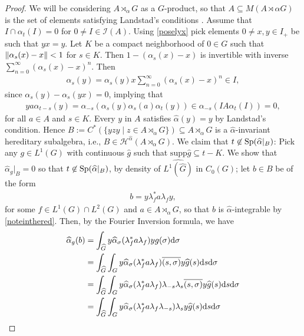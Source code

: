 \begin{proof}
	We will be considering $A \rtimes_\alpha G$ as a $G$-product, so that $A \subseteq M(A \rtimes\alpha G)$ is the set of elements satisfying Landstad's conditions . Assume that $I \cap \alpha_t(I) = 0$ for $0 \neq I \in \mathcal{I}(A)$. Using \cref{poselyx} pick elements $0 \neq x,y \in I_+$ be such that $yx=y$. Let $K$ be a compact neighborhood of $0 \in G$ such that $ \left\lVert \alpha_s(x)-x\right\rVert < 1$ for $s \in K$. Then $1-(\alpha_s(x)-x)$ is invertible with inverse $\sum_{n=0}^\infty (\alpha_s(x)-x)^n$. Then
	\begin{align*}
		\alpha_s(y)=\alpha_s(y)x \sum_{n=0}^\infty (\alpha_s(x)-x)^n \in I,
	\end{align*}
	since $\alpha_s(y)-\alpha_s(yx)=0$, implying that 
	\begin{align*}
	y a \alpha_{t-s}(y) = \alpha_{-s}(\alpha_s(y)\alpha_s(a)\alpha_t(y)) \in  \alpha_{-s}(I A \alpha_t(I)) = 0,
	\end{align*}
	for all $a \in A$ and $s \in K$. Every $y$ in $A$ satisfies $\hat\alpha(y) = y$ by Landstad's condition. Hence $B:= C^*(\{y z y \mid z \in A \rtimes_\alpha G\}) \subseteq A \rtimes_\alpha G$ is a $\hat \alpha$-invariant hereditary subalgebra, i.e., $B \in \mathscr{H}^{\hat \alpha}(A \rtimes_\alpha G)$. We claim that $t \not \in \mathrm{Sp}(\widehat{\alpha} |_B)$: Pick any $g \in L^1(G)$ with continuous $\hat g$ such that $\mathrm{supp} \hat g \subseteq t-K$. We show that $\hat \alpha_g |_B = 0$ so that $t \not\in \mathrm{Sp}(\widehat{\alpha}|_B)$, by density of $\hat {L^1(\hat G)}$ in $C_0(G)$; let $b \in B$ be of the form
	\begin{align*}
		b = y \lambda_f^* a \lambda_f y,
	\end{align*}
	for some $f \in L^1(G) \cap L^2(G)$ and $ a \in A \rtimes_\alpha G$, so that $b$ is $\hat \alpha$-integrable by \cref{noteinthered}. Then, by the Fourier Inversion formula, we have 
	\begin{align*}
		\hat \alpha_g(b) &= \int_{\hat G} y \hat \alpha_\sigma(\lambda_f^* a \lambda_f) y g(\sigma) \d \sigma \\
		&= \int_{\hat G} \int_G y \hat \alpha_\sigma(\lambda_f^* a \lambda_f) \overline{(s,\sigma)} y \hat g(s) \d s \d \sigma\\
		&= \int_{\hat G} \int_G y \hat \alpha_\sigma(\lambda_f^* a \lambda_f) \lambda_{-s} \lambda_s \overline{(s,\sigma)} y \hat g(s) \d s \d \sigma\\
		&= \int_{\hat G} \int_G y \hat \alpha_{\sigma}(\lambda_f^* a \lambda_f \lambda_{-s}) \lambda_s y \hat g(s) \d s \d \sigma\\

\end{align*}
\end{proof}

